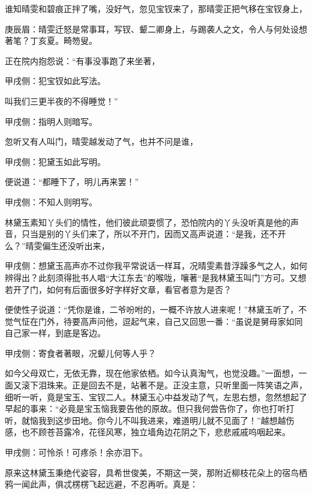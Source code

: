 \begin{parag}
    谁知晴雯和碧痕正拌了嘴，没好气，忽见宝钗来了，那晴雯正把气移在宝钗身上，\begin{note}庚辰眉：晴雯迁怒是常事耳，写钗、颦二卿身上，与踢袭人之文，令人与何处设想著笔？丁亥夏。畸笏叟。\end{note}正在院内抱怨说：“有事没事跑了来坐著，\begin{note}甲戌侧：犯宝钗如此写法。\end{note}叫我们三更半夜的不得睡觉！”\begin{note}甲戌侧：指明人则暗写。\end{note}忽听又有人叫门，晴雯越发动了气，也并不问是谁，\begin{note}甲戌侧：犯黛玉如此写明。\end{note}便说道：“都睡下了，明儿再来罢！”\begin{note}甲戌侧：不知人则明写。\end{note}林黛玉素知丫头们的情性，他们彼此顽耍惯了，恐怕院内的丫头没听真是他的声音，只当是别的丫头们来了，所以不开门，因而又高声说道：“是我，还不开么？”晴雯偏生还没听出来，\begin{note}甲戌侧：想黛玉高声亦不过你我平常说话一样耳，况晴雯素昔浮躁多气之人，如何辨得出？此刻须得批书人唱“大江东去”的喉咙，嚷著“是我林黛玉叫门”方可。又想若开了门，如何有后面很多好字样好文章，看官者意为是否？\end{note}便使性子说道：“凭你是谁，二爷吩咐的，一概不许放人进来呢！”林黛玉听了，不觉气怔在门外，待要高声问他，逗起气来，自己又回思一番：“虽说是舅母家如同自己家一样，到底是客边。\begin{note}甲戌侧：寄食者著眼，况颦儿何等人乎？\end{note}如今父母双亡，无依无靠，现在他家依栖。如今认真淘气，也觉没趣。”一面想，一面又滚下泪珠来。正是回去不是，站著不是。正没主意，只听里面一阵笑语之声，细听一听，竟是宝玉、宝钗二人。林黛玉心中益发动了气，左思右想，忽然想起了早起的事来：“必竟是宝玉恼我要告他的原故。但只我何尝告你了，你也打听打听，就恼我到这步田地。你今儿不叫我进来，难道明儿就不见面了！”越想越伤感，也不顾苍苔露冷，花径风寒，独立墙角边花阴之下，悲悲戚戚呜咽起来。\begin{note}甲戌侧：可怜杀！可疼杀！余亦泪下。\end{note}
\end{parag}


\begin{parag}
    原来这林黛玉秉绝代姿容，具希世俊美，不期这一哭，那附近柳枝花朵上的宿鸟栖鸦一闻此声，俱忒楞楞飞起远避，不忍再听。真是：
\end{parag}


